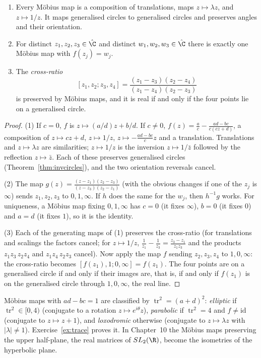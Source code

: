 \begin{theorem}\label{thm:mobius}
\begin{enumerate}
\item Every M\"obius map is a composition of translations, maps $z\mapsto\lambda z$, and $z\mapsto1/z$. It maps generalised circles to
generalised circles and preserves angles and their orientation.
\item For distinct $z_1,z_2,z_3\in\hat{\C}$ and distinct $w_1,w_2,w_3\in\hat{\C}$ there is exactly one M\"obius map with $f(z_j)=w_j$.
\item The \emph{cross-ratio}
\[
[z_1,z_2;z_3,z_4]=\frac{(z_1-z_3)(z_2-z_4)}{(z_1-z_4)(z_2-z_3)}
\]
is preserved by M\"obius maps, and it is real if and only if the four points lie on a generalised circle.
\end{enumerate}
\end{theorem}
\begin{proof}
(1) If $c=0$, $f$ is $z\mapsto(a/d)z+b/d$. If $c\ne0$, $f(z)=\frac ac-\frac{ad-bc}{c(cz+d)}$, a composition of $z\mapsto cz+d$, $z\mapsto1/z$,
$z\mapsto-\frac{ad-bc}cz$ and a translation. Translations and $z\mapsto\lambda z$ are similarities; $z\mapsto1/z$ is the inversion $z\mapsto1/\bar z$
followed by the reflection $z\mapsto\bar z$. Each of these preserves generalised circles (Theorem~\ref{thm:invcircles}), and the two orientation
reversals cancel.

(2) The map $g(z)=\frac{(z-z_1)(z_2-z_3)}{(z-z_3)(z_2-z_1)}$ (with the obvious changes if one of the $z_j$ is $\infty$) sends $z_1,z_2,z_3$ to
$0,1,\infty$. If $h$ does the same for the $w_j$, then $h^{-1}g$ works. For uniqueness, a M\"obius map fixing $0,1,\infty$ has $c=0$ (it fixes
$\infty$), $b=0$ (it fixes $0$) and $a=d$ (it fixes $1$), so it is the identity.

(3) Each of the generating maps of (1) preserves the cross-ratio (for translations and scalings the factors cancel; for $z\mapsto1/z$,
$\frac1{z_1}-\frac1{z_3}=\frac{z_3-z_1}{z_1z_3}$ and the products $z_1z_3\,z_2z_4$ and $z_1z_4\,z_2z_3$ cancel). Now apply the map $f$ sending
$z_2,z_3,z_4$ to $1,0,\infty$: the cross-ratio becomes $[f(z_1),1;0,\infty]=f(z_1)$. The four points are on a generalised circle if and only if
their images are, that is, if and only if $f(z_1)$ is on the generalised circle through $1,0,\infty$, the real line.
\end{proof}

\begin{remark}
M\"obius maps with $ad-bc=1$ are classified by $\operatorname{tr}^2=(a+d)^2$: \emph{elliptic} if $\operatorname{tr}^2\in[0,4)$ (conjugate to a rotation
$z\mapsto e^{i\theta}z$), \emph{parabolic} if $\operatorname{tr}^2=4$ and $f\ne\mathrm{id}$ (conjugate to $z\mapsto z+1$), and \emph{loxodromic} otherwise
(conjugate to $z\mapsto\lambda z$ with $|\lambda|\ne1$). Exercise~\ref{ex:trace} proves it. In Chapter~10 the M\"obius maps preserving the upper
half-plane, the real matrices of $SL_2(\R)$, become the isometries of the hyperbolic plane.
\end{remark}

